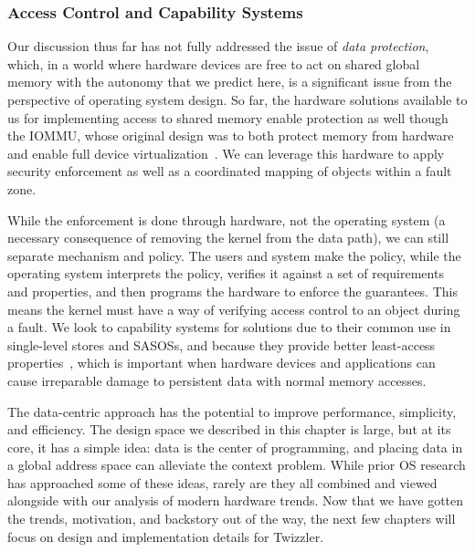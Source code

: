 \subsubsection{Access Control and Capability Systems}
Our discussion thus far has not fully addressed the issue of \emph{data protection}, which, in a world
where hardware devices are free to act on shared global memory with the autonomy that we predict
here, is a significant issue from the perspective of operating system design. So far, the hardware
solutions available to us for implementing access to shared memory enable
protection as well though the IOMMU, whose original design was to both protect memory from hardware
and enable full device virtualization~\cite{markuze2016true}. We can leverage this hardware to apply
security enforcement as well as a coordinated mapping of objects within a fault zone.

While the enforcement is done through hardware, not the operating system (a necessary consequence of
removing the kernel from the data path), we can still separate mechanism and policy. The users
and system make the policy, while the operating system interprets the policy, verifies it against a
set of requirements and properties, and then programs the hardware to enforce the guarantees. This
means the kernel must have a way of verifying access control to an object during a fault. We look to
capability systems for solutions due to their common use in single-level stores and SASOSs, and
because they provide better least-access properties~\cite{capmyth}, which is important when hardware devices and
applications can cause irreparable damage to persistent data with normal memory accesses.


\begin{chconc}
    The data-centric approach has the potential to improve performance, simplicity, and efficiency. The design space we
    described in this chapter is large, but at its core, it has a simple idea: data is the center of programming, and
    placing data in a global address space can alleviate the context problem. While prior OS research has approached
    some of these ideas, rarely are they all combined and viewed alongside with our analysis of modern hardware trends.
    Now that we have gotten the trends, motivation, and backstory out of the way, the next few chapters will focus on
    design and implementation details for Twizzler.
\end{chconc}